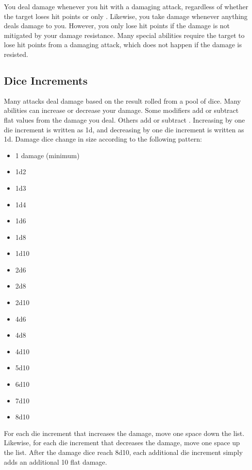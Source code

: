     You deal damage whenever you hit with a damaging attack, regardless of whether the target loses hit points or only .
    Likewise, you take damage whenever anything deals damage to you.
    However, you only lose hit points if the damage is not mitigated by your damage resistance.
    Many special abilities require the target to lose hit points from a damaging attack, which does not happen if the damage is resisted.

    \subsection{Dice Increments}\label{Dice Increments}
        Many attacks deal damage based on the result rolled from a pool of dice.
        Many abilities can increase or decrease your damage.
        Some modifiers add or subtract flat values from the damage you deal.
        Others add or subtract .
        Increasing by one die increment is written as \plus1d, and decreasing by one die increment is written as \minus1d.
        Damage dice change in size according to the following pattern:
        \begin{itemize}
            \item 1 damage (minimum)
            \item 1d2
            \item 1d3
            \item 1d4
            \item 1d6
            \item 1d8
            \item 1d10
            \item 2d6
            \item 2d8
            \item 2d10
            \item 4d6
            \item 4d8
            \item 4d10
            \item 5d10
            \item 6d10
            \item 7d10
            \item 8d10
        \end{itemize}

        For each die increment that increases the damage, move one space down the list.
        Likewise, for each die increment that decreases the damage, move one space up the list.
        After the damage dice reach 8d10, each additional die increment simply adds an additional 10 flat damage.

